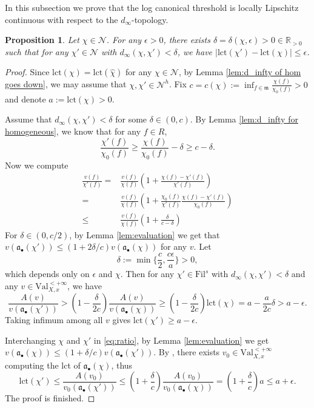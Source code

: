 \documentclass[11pt, leqno]{amsart}%
\theoremstyle{plain}
\newtheorem{proposition}[theorem]{Proposition}
\theoremstyle{definition}
\theoremstyle{remark}
\newcommand{\cN}{\mathcal{N}}
\newcommand{\bR}{\mathbb{R}}
\newcommand{\fa}{\mathfrak{a}}
\newcommand{\fm}{\mathfrak{m}}
\newcommand{\lct}{\mathrm{lct}}
\newcommand{\Val}{\mathrm{Val}}
\newcommand{\Fil}{\mathrm{Fil}}
\numberwithin{equation}{section}
\begin{document}
In this subsection we prove that the log canonical threshold is locally Lipschitz continuous with respect to the $d_\infty$-topology.

\begin{proposition}\label{prop:lip of lct}
    Let $\chi\in\cN$. For any $\epsilon>0$, there exists $\delta=\delta(\chi,\epsilon)>0\in\bR_{>0}$ such that for any $\chi'\in\cN$ with $d_\infty(\chi,\chi')<\delta$, we have $|\lct(\chi')-\lct(\chi)|\le \epsilon$.
\end{proposition}

\begin{proof}
    Since $\lct(\chi)=\lct(\widehat\chi)$ for any $\chi\in\cN$, by Lemma \ref{lem:d_infty of hom goes down}, we may assume that $\chi,\chi'\in\cN^h$. 
    Fix $c=c(\chi):=\inf_{f\in\fm}\frac{\chi(f)}{\chi_0(f)}>0$ and denote $a:=\lct(\chi)>0$.

    Assume that $d_\infty(\chi,\chi')<\delta$ for some $\delta\in(0,c)$. By Lemma \ref{lem:d_infty for homogeneous}, we know that for any $f\in R$, 
    \[
        \frac{\chi'(f)}{\chi_0(f)}\ge \frac{\chi(f)}{\chi_0(f)}-\delta\ge c-\delta.
    \]
    Now we compute 
    \begin{equation}\label{eq:ratio}\begin{aligned}
        \frac{v(f)}{\chi'(f)}=&\frac{v(f)}{\chi(f)}\left(1+\frac{\chi(f)-\chi'(f)}{\chi'(f)}\right)\\
        =&\frac{v(f)}{\chi(f)}\left(1+\frac{\chi_0(f)}{\chi'(f)}\frac{\chi(f)-\chi'(f)}{\chi_0(f)}\right)\\
        \le&\frac{v(f)}{\chi(f)}\left(1+\frac{\delta}{c-\delta}\right)
    \end{aligned}\end{equation}
    For $\delta\in(0,c/2)$, by Lemma \ref{lem:evaluation} we get that $v(\fa_\bullet(\chi'))\le(1+2\delta/c)v(\fa_\bullet(\chi))$ for any $v$. Let 
    \[
        \delta:=\min\{\frac{c}{2},\frac{c\epsilon}{a}\}>0,
    \]
    which depends only on $\epsilon$ and $\chi$. Then for any $\chi'\in\Fil^s$ with $d_\infty(\chi,\chi')<\delta$ and any $v\in\Val^{<+\infty}_{X,x}$, we have
    \[
        \frac{A(v)}{v(\fa_\bullet(\chi'))}> (1-\frac{\delta}{2c})\frac{A(v)}{v(\fa_\bullet(\chi))}\ge (1-\frac{\delta}{2c})\lct(\chi)=a-\frac{a}{2c}\delta>a-\epsilon.
    \]
    Taking infimum among all $v$ gives $\lct(\chi')\ge a-\epsilon$.

    Interchanging $\chi$ and $\chi'$ in \eqref{eq:ratio}, by Lemma \ref{lem:evaluation} we get $v(\fa_\bullet(\chi))\le (1+\delta/c)v(\fa_\bullet(\chi'))$. By \cite[Theorem B.1]{Blu18}, there exists $v_0\in\Val^{<+\infty}_{X,x}$ computing the lct of $\fa_\bullet(\chi)$, thus
    \[
        \lct(\chi')\le\frac{A(v_0)}{v_0(\fa_\bullet(\chi'))}\le (1+\frac{\delta}{c})\frac{A(v_0)}{v_0(\fa_\bullet(\chi))}=(1+\frac{\delta}{c})a\le a+\epsilon.
    \]
    The proof is finished.
\end{proof}
\end{document}
